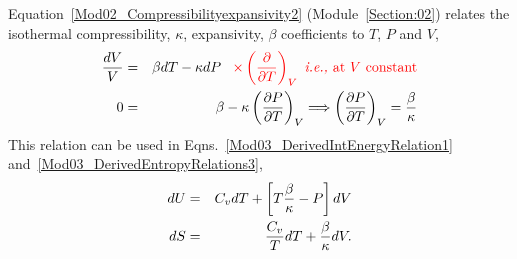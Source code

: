Equation~\ref{Mod02_Compressibilityexpansivity2} (Module~\ref{Section:02}) relates the isothermal compressibility, $\kappa$, expansivity, $\beta$ coefficients to $T$, $P$ and $V$,
     \begin{eqnarray}
        \frc{dV}{V} &=& \beta dT - \kappa dP \;\;\;\red{\times\Partial[]{T}{V} \nonumber \text{ \ie at }V\text{ constant}} \nonumber \\
            0       &=& \beta - \kappa\Partial[P]{T}{V} \Longrightarrow \Partial[P]{T}{V} = \frc{\beta}{\kappa} \nonumber
     \end{eqnarray}
This relation can be used in Eqns.~\ref{Mod03_DerivedIntEnergyRelation1} and~\ref{Mod03_DerivedEntropyRelations3},
     \begin{eqnarray}
        dU &=& C_{v}dT + \left[T\frc{\beta}{\kappa}-P\right]dV\label{Mod03_DerivedIntEnergyRelation2} \\
        dS &=& \frc{C_{v}}{T}dT + \frc{\beta}{\kappa}dV.\label{Mod03_DerivedEntropyRelations4}
     \end{eqnarray}

